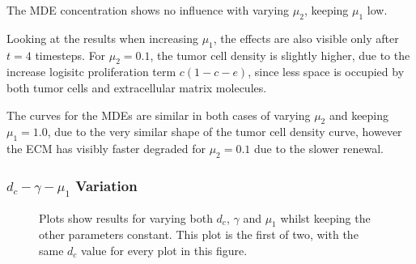 The MDE concentration shows no influence with varying $\mu_2$, keeping $\mu_1$ low.

Looking at the results when increasing $\mu_1$, the effects are also visible only after $t=4$ timesteps. For $\mu_2=0.1$, the tumor cell density is slightly higher, due to the increase logisitc proliferation term $c(1-c-e)$, since less space is occupied by both tumor cells and extracellular matrix molecules. 

The curves for the MDEs are similar in both cases of varying $\mu_2$ and keeping $\mu_1=1.0$, due to the very similar shape of the tumor cell density curve, however the ECM has visibly faster degraded for $\mu_2=0.1$ due to the slower renewal.

\subsubsection*{$d_c - \gamma - \mu_1$ Variation}
\begin{figure}[ht!]
    \centering
    \caption{Plots show results for varying both $d_c$, $\gamma$ and $\mu_1$ whilst keeping the other parameters constant. This plot is the first of two, with the same $d_c$ value for every plot in this figure.}
    \label{fig:prolif_dc_gamma_mu_1_variation_1}
\end{figure}

